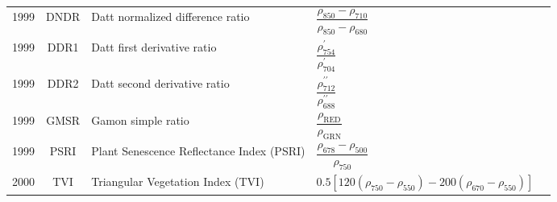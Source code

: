 \documentclass[10pt]{article}
\begin{document}
\begin{ThreePartTable}
\begin{longtable}{c c m{2.80in} M{2.80in} M{1.5in}}
  1999 & DNDR    & Datt normalized difference ratio                                               & $\dfrac{\rho_{850}-\rho_{710}}{\rho_{850}-\rho_{680}}$                                                                                                                                                                                                                                  & \citet{Datt1999a,Datt1999b}                         \\
  1999 & DDR1    & Datt first derivative ratio                                                    & $\dfrac{\rho^\prime_{754}}{\rho^\prime_{704}}$                                                                                                                                                                                                                                          & \citet{Datt1999b}                                   \\
  1999 & DDR2    & Datt second derivative ratio                                                   & $\dfrac{\rho^{\prime\prime}_{712}}{\rho^{\prime\prime}_{688}}$                                                                                                                                                                                                                          & \citet{Datt1999b}                                   \\
  1999 & GMSR    & Gamon simple ratio                                                             & $\dfrac{\rho_\text{RED}}{\rho_\text{GRN}}$                                                                                                                                                                                                                                              & \citet{Gamon1999}                                   \\
  1999 & PSRI    & Plant Senescence Reflectance Index (PSRI)                                      & $\dfrac{\rho_{678}-\rho_{500}}{\rho_{750}}$                                                                                                                                                                                                                                             & \citet{Merzlyak1999}                                \\
  2000 & TVI     & Triangular Vegetation Index (TVI)                                              & $0.5[120(\rho_{750}-\rho_{550})-200(\rho_{670}-\rho_{550})]$                                                                                                                                                                                                                            & \citet{Broge2000}                                   \\

\end{longtable}
\end{ThreePartTable}
\end{document}

